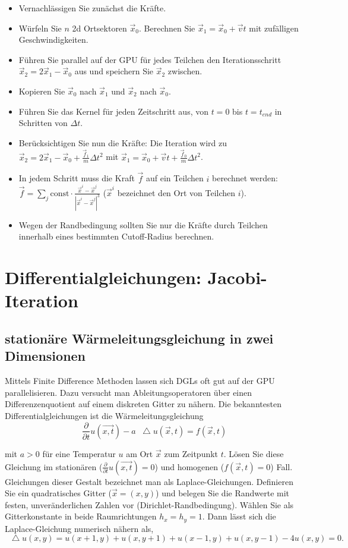 \documentclass[headsepline=3pt,headinclude=true,12pt,oneside]{scrartcl}
\newcommand*\Laplace{\mathop{}\!\mathbin\bigtriangleup}
\begin{document}
	\begin{itemize}
		\item Vernachlässigen Sie zunächst die Kräfte.
		\item Würfeln Sie $n$ 2d Ortsektoren $\vec{x}_0$. Berechnen Sie $\vec{x}_1 = \vec{x}_0 + \vec{v}t$ mit zufälligen Geschwindigkeiten.
		\item Führen Sie parallel auf der GPU für jedes Teilchen den Iterationsschritt $\vec{x}_2 = 2\vec{x}_1 - \vec{x}_0$ aus und speichern Sie $\vec{x}_2$ zwischen.
		\item Kopieren Sie $\vec{x}_0$ nach $\vec{x}_1$ und $\vec{x}_2$ nach $\vec{x}_0$.
		\item Führen Sie das Kernel für jeden Zeitschritt aus, von $t = 0$ bis $t = t_{end}$ in Schritten von $\Delta t$.
		
		\item Berücksichtigen Sie nun die Kräfte: Die Iteration wird zu $\vec{x}_2 = 2\vec{x}_1 - \vec{x}_0 + \frac{\vec{f}_1}{m}\Delta t^2$ mit $\vec{x}_1 = \vec{x}_0 + \vec{v}t + \frac{\vec{f}_0}{m}\Delta t^2$.
		\item In jedem Schritt muss die Kraft $\vec{f}$ auf ein Teilchen $i$ berechnet werden: $\vec{f} = \sum_j \text{const}\cdot \frac{\vec{x}^i-\vec{x}^j}{|\vec{x}^i-\vec{x}^j|^3}$ ($\vec{x}^i$ bezeichnet den Ort von Teilchen $i$).
		\item Wegen der Randbedingung sollten Sie nur die Kräfte durch Teilchen innerhalb eines bestimmten Cutoff-Radius berechnen.
	\end{itemize}
	
	\section{Differentialgleichungen: Jacobi-Iteration}
	\subsection{stationäre Wärmeleitungsgleichung in zwei Dimensionen}
	Mittels Finite Difference Methoden lassen sich DGLs oft gut auf der GPU parallelisieren. Dazu versucht man Ableitungsoperatoren über einen Differenzenquotient auf einem diskreten Gitter zu nähern. Die bekanntesten Differentialgleichungen ist die Wärmeleitungsgleichung 
	\begin{equation}
		\frac{\partial}{\partial{t}}u(\vec{x,t}) - a\Laplace u(\vec{x},t) = f(\vec{x},t)
	\end{equation}
	
	mit $a > 0$ für eine Temperatur $u$ am Ort $\vec{x}$ zum Zeitpunkt $t$. Lösen Sie diese Gleichung im stationären ($\frac{\partial}{\partial{t}}u(\vec{x,t}) = 0$) und homogenen ($f(\vec{x},t) = 0$) Fall. Gleichungen dieser Gestalt bezeichnet man als Laplace-Gleichungen.
	Definieren Sie ein quadratisches Gitter ($\vec{x}=(x,y)$) und belegen Sie die Randwerte mit festen, unveränderlichen Zahlen vor (Dirichlet-Randbedingung). Wählen Sie als Gitterkonstante in beide Raumrichtungen $h_x=h_y=1$. Dann lässt sich die Laplace-Gleichung numerisch nähern als,
	\begin{equation}
		\Laplace u(x,y) = u(x+1,y) + u(x,y+1) + u(x-1,y) + u(x,y-1) - 4u(x,y) = 0.
	\end{equation}		 
		
\end{document}
